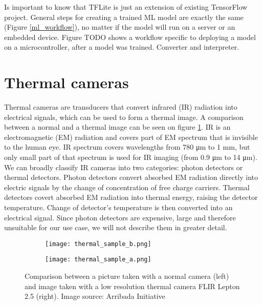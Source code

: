 Is important to know that TFLite is just an extension of existing TensorFlow project.
General steps for creating a trained ML model are exactly the same (Figure \ref{ml_workflow}), no matter if the model will run on a server or an embedded device.
Figure TODO shows a workflow specific to deploying a model on a microcontroller, after a model was trained.
Converter and interpreter.




\section{ Thermal cameras}

Thermal cameras are transducers that convert infrared (IR) radiation into electrical signals, which can be used to form a thermal image.
A comparison between a normal and a thermal image can be seen on figure \ref{thermal_comparison}.
IR is an electromagnetic (EM) radiation and covers part of EM spectrum that is invisible to the human eye.
IR spectrum covers wavelengths from 780 \si{\micro\meter} to 1 \si{\milli\meter}, but only small part of that spectrum is used for IR imaging (from 0.9 \si{\micro\meter} to 14 \si{\micro\meter})\cite{thermal_book}.
We can broadly classify IR cameras into two categories: photon detectors or thermal detectors\cite{thermal_book}.
Photon detectors convert absorbed EM radiation directly into electric signals by the change of concentration of free charge carriers\cite{thermal_book}.
Thermal detectors covert absorbed EM radiation into thermal energy, raising the detector temperature\cite{thermal_book}. 
Change of detector's temperature is then converted into an electrical signal.
Since photon detectors are expensive, large and therefore unsuitable for our use case, we will not describe them in greater detail.

\begin{figure}[ht]
    \begin{subfigure}{0.5\textwidth}
        \centering
        \texttt{[image: thermal\_sample\_b.png]} 
    \end{subfigure}
    \begin{subfigure}{0.5\textwidth}
        \centering
        \texttt{[image: thermal\_sample\_a.png]}
    \end{subfigure}
    \caption{Comparison between a picture taken with a normal camera (left) and image taken with a low resolution thermal camera FLIR Lepton 2.5 (right). Image source: Arribada Initiative\cite{thermal_comparison}}
    \label{thermal_comparison}
\end{figure}

